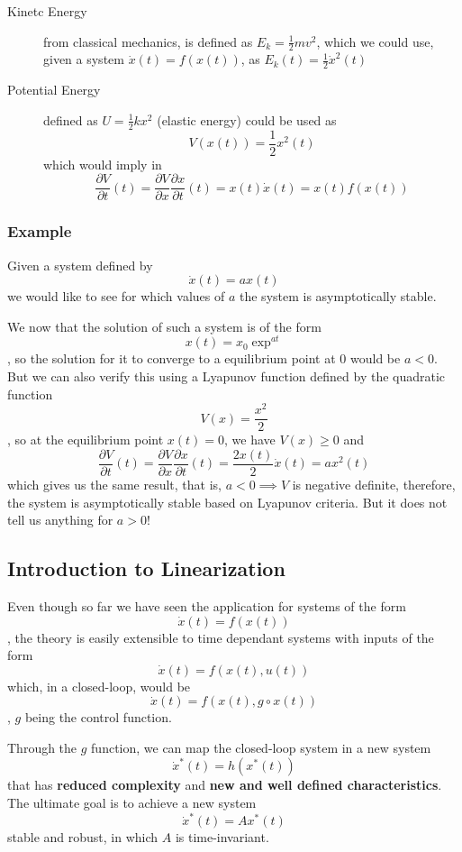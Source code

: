 \begin{description}
    \item[Kinetc Energy] from classical mechanics, is defined as $E_k = \frac{1}{2}mv^{2}$, which we could use, given a system $\dot{x}(t)=f\left( x(t) \right) $, as $E_k(t)=\frac{1}{2}\dot{x}^{2}(t)$
    \item[Potential Energy] defined as $U=\frac{1}{2}kx^{2}$ (elastic energy) could be used as \[
    V(x(t))=\frac{1}{2}x^{2}(t)
    \] which would imply in \[
    \frac{\partial V}{\partial t} (t)=\frac{\partial V}{\partial x} \frac{\partial x}{\partial t} (t)=x(t)\dot{x}(t)=x(t)f\left( x(t) \right) 
    \] 
\end{description}

\subsubsection*{Example}

Given a system defined by \[
\dot{x}(t)=ax(t)
\] we would like to see for which values of $a$ the system is asymptotically stable.

We now that the solution of such a system is of the form \[
x(t)=x_0\exp^{at}
\], so the solution for it to converge to a equilibrium point at 0 would be $a<0$. But we can also verify this using a Lyapunov function defined by the quadratic function \[
V(x) = \frac{x^{2}}{2}
\], so at the equilibrium point $x(t)=0$, we have $V(x)\ge 0$ and \[
\frac{\partial V}{\partial t}(t) =\frac{\partial V}{\partial x} \frac{\partial x}{\partial t}(t) = \frac{2x(t)}{2}\dot{x}(t) = ax^{2}(t)
\] which gives us the same result, that is, $a<0\implies V$ is negative definite, therefore, the system is asymptotically stable based on Lyapunov criteria. But it does not tell us anything for $a>0$!

\subsection*{Introduction to Linearization}

Even though so far we have seen the application for systems of the form \[
\dot{x}(t)=f\left( x(t) \right) 
\], the theory is easily extensible to time dependant systems with inputs of the form \[
\dot{x}(t)=f\left( x(t),u(t) \right) 
\] which, in a closed-loop, would be \[
\dot{x}(t)=f\left( x(t),g\circ x(t) \right) 
\], $g$ being the control function.

Through the $g$ function, we can map the closed-loop system in a new system \[
\dot{x}^{*}(t)=h\left( x^{*}(t) \right) 
\] that has \textbf{reduced complexity} and \textbf{new and well defined characteristics}. The ultimate goal is to achieve a new system \[
\dot{x}^{*}(t)=Ax^{*}(t)
\] stable and robust, in which $A$ is time-invariant.

